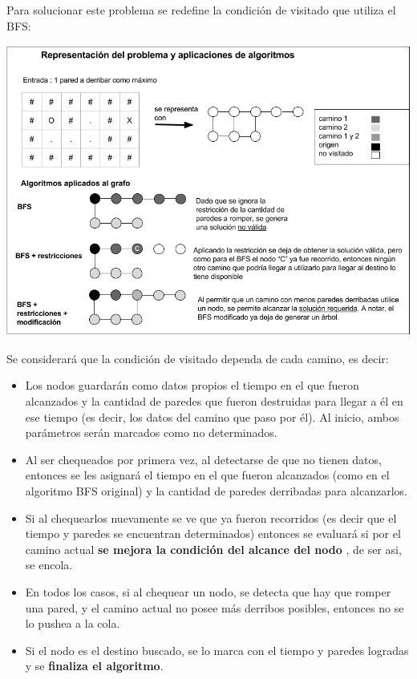 Para solucionar este problema se redefine la condición de visitado que utiliza el BFS:

  \vspace*{0.3cm} \vspace*{0.3cm}
  \begin{center}
 \includegraphics[scale=0.6]{./EJ1/ej1-explicacion.png}
  \end{center}
  \vspace*{0.3cm}

Se considerará que la condición de visitado dependa de cada camino, es decir:

\begin{itemize}
	\item Los nodos guardarán como datos propios el tiempo en el que fueron alcanzados y la cantidad de paredes que fueron destruidas para llegar a él en ese tiempo (es decir, los datos del camino que paso por él). Al inicio, ambos par\'ametros serán marcados como no determinados.
	\item Al ser chequeados por primera vez, al detectarse de que no tienen datos, entonces se les asignará el tiempo en el que fueron alcanzados (como en el algoritmo BFS original) y la cantidad de paredes derribadas para alcanzarlos.
	\item Si al chequearlos nuevamente se ve que ya fueron recorridos (es decir que el tiempo y paredes se encuentran determinados) entonces se evaluará si por el camino actual {\bf se mejora la condición del alcance del nodo} , de ser asi, se encola.
	\item En todos los casos, si al chequear un nodo, se detecta que hay que romper una pared, y el camino actual no posee más derribos posibles, entonces no se lo pushea a la cola.
	\item Si el nodo es el destino buscado, se lo marca con el tiempo y paredes logradas y se {\bf finaliza el algoritmo}.
	
\end{itemize}

